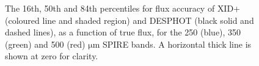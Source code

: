 \documentclass[useAMS,usenatbib]{mnras}
\begin{document}
\begin{figure}
\centering 
\caption{The 16th, 50th and 84th percentiles for flux accuracy of \textsc{XID+} (coloured line and shaded region) and \textsc{DESPHOT} (black solid and dashed lines), as a function of true flux, for the 250 (blue), 350 (green) and 500 (red) $\mathrm{\mu m}$ SPIRE bands. A horizontal thick line is shown at zero for clarity.}\label{fig:accuracy}
\end{figure}
\end{document}
